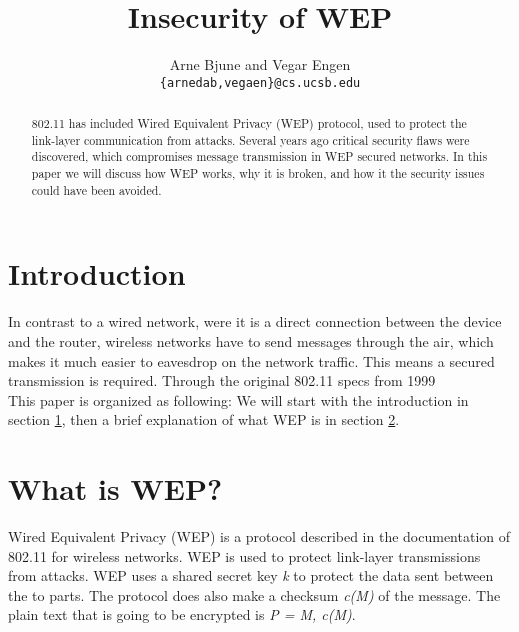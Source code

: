 \documentclass[twocolumn]{IEEEtran}
\begin{document}
\title{Insecurity of WEP}


\author{Arne Bjune and Vegar Engen \\ \texttt{\{arnedab,vegaen\}@cs.ucsb.edu}}


\maketitle

\begin{abstract}
802.11 has included Wired Equivalent Privacy (WEP) protocol, used to protect the 
link-layer communication from attacks. Several years ago critical 
security flaws were discovered, which compromises message transmission in WEP secured networks. 
In this paper we will discuss how WEP works, why it is broken, and how it the security issues
could have been avoided.
\end{abstract}

\section {Introduction}
\label{sec:introduction}


In contrast to 
a wired network, were it is a direct connection between the device and the router, wireless
networks have to send messages through the air, which makes it much easier to eavesdrop on the 
network traffic. This means a secured transmission is required. Through the original 802.11 
specs from 1999 \cite{IEEE:Fast}   \\

This paper is organized as following: We will start with the introduction in 
section \ref{sec:introduction}, then a brief explanation of what WEP is in 
section \ref{sec:whatiswep}. 


\section {What is WEP?}
\label{sec:whatiswep}

Wired Equivalent Privacy (WEP) is a protocol described in the documentation of 802.11 for 
wireless networks. WEP is used to protect link-layer transmissions from attacks. WEP uses a 
shared secret key \emph{k} to protect the data sent between the to parts. The protocol does also
make a checksum \emph{c(M)} of the message. The plain text that is going to be encrypted is 
\emph{P = M, c(M)}. 
\end{document}
